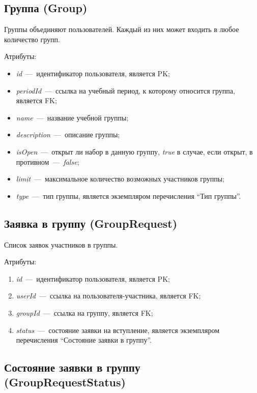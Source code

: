 \documentclass[14pt]{article}
\begin{document}
\subsection{Группа (Group)}

Группы объединяют пользователей. Каждый из них может входить в любое количество групп.

Атрибуты:
\begin{itemize}
	\item \emph{id}~---~идентификатор пользователя, является PK;
	\item \emph{periodId}~---~ссылка на учебный период, к которому относится группа, является FK;
	\item \emph{name}~---~название учебной группы;
	\item \emph{description}~---~описание группы;
	\item \emph{isOpen}~---~открыт ли набор в данную группу, \emph{true} в случае, если открыт, в противном~---~\emph{false};
	\item \emph{limit}~---~максимальное количество возможных участников группы;	
	\item \emph{type}~---~тип группы, является экземпляром перечисления ``Тип группы''.
\end{itemize}

\subsection{Заявка в группу (GroupRequest)}

Список заявок участников в группы.

Атрибуты:
\begin{enumerate}
	\item \emph{id}~---~идентификатор пользователя, является PK; 
	\item \emph{userId}~---~ссылка на пользователя-участника, является FK;
	\item \emph{groupId}~---~ссылка на группу, является FK;
	\item \emph{status}~---~состояние заявки на вступление, является экземпляром перечисления ``Состояние заявки в группу''.
\end{enumerate}


\subsection{Состояние заявки в группу (GroupRequestStatus)}
\end{document}
